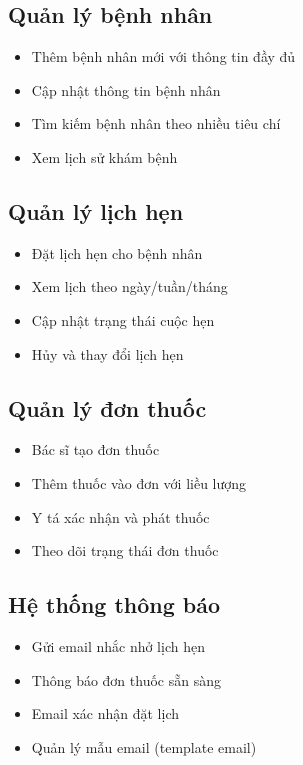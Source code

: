 \documentclass[12pt,a4paper]{report}
\begin{document}
    \subsection{Quản lý bệnh nhân}
    \begin{itemize}
        \item Thêm bệnh nhân mới với thông tin đầy đủ
        \item Cập nhật thông tin bệnh nhân
        \item Tìm kiếm bệnh nhân theo nhiều tiêu chí
        \item Xem lịch sử khám bệnh
    \end{itemize}

    \subsection{Quản lý lịch hẹn}
    \begin{itemize}
        \item Đặt lịch hẹn cho bệnh nhân
        \item Xem lịch theo ngày/tuần/tháng
        \item Cập nhật trạng thái cuộc hẹn
        \item Hủy và thay đổi lịch hẹn
    \end{itemize}

    \subsection{Quản lý đơn thuốc}
    \begin{itemize}
        \item Bác sĩ tạo đơn thuốc
        \item Thêm thuốc vào đơn với liều lượng
        \item Y tá xác nhận và phát thuốc
        \item Theo dõi trạng thái đơn thuốc
    \end{itemize}

    \subsection{Hệ thống thông báo}
    \begin{itemize}
        \item Gửi email nhắc nhở lịch hẹn
        \item Thông báo đơn thuốc sẵn sàng
        \item Email xác nhận đặt lịch
        \item Quản lý mẫu email (template email)
    \end{itemize}
\end{document}
